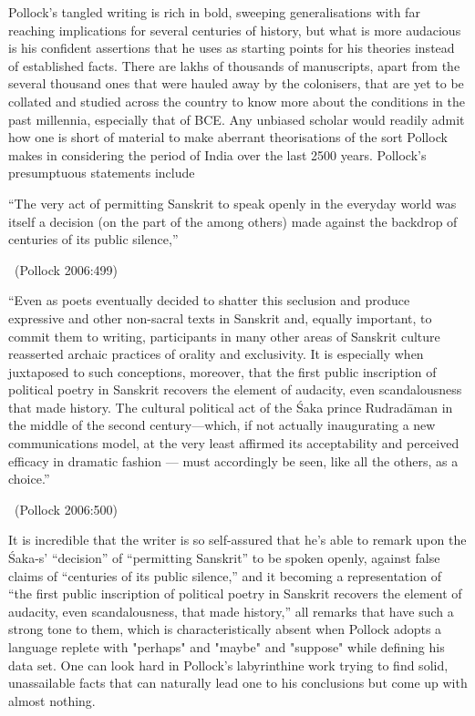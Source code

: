 Pollock’s tangled writing is rich in bold, sweeping generalisations with far reaching implications for several centuries of history, but what is more audacious is his confident assertions that he uses as starting points for his theories instead of established facts. There are lakhs of thousands of manuscripts, apart from the several thousand ones that were hauled away by the colonisers, that are yet to be collated and studied across the country to know more about the conditions in the past millennia, especially that of BCE. Any unbiased scholar would readily admit how one is short of material to make aberrant theorisations of the sort Pollock makes in considering the period of India over the last 2500 years. Pollock’s presumptuous statements include

\begin{myquote}
“The very act of permitting Sanskrit to speak openly in the everyday world was itself a decision (on the part of the among others) made against the backdrop of centuries of its public silence,” 

~\hfill (Pollock 2006:499)
\end{myquote}

\begin{myquote}
“Even as poets eventually decided to shatter this seclusion and produce expressive and other non-sacral texts in Sanskrit and, equally important, to commit them to writing, participants in many other areas of Sanskrit culture reasserted archaic practices of orality and exclusivity. It is especially when juxtaposed to such conceptions, moreover, that the first public inscription of political poetry in Sanskrit recovers the element of audacity, even scandalousness that made history. The cultural political act of the Śaka prince Rudradāman in the middle of the second century—which, if not actually inaugurating a new communications model, at the very least affirmed its acceptability and perceived efficacy in dramatic fashion — must accordingly be seen, like all the others, as a choice.” 

~\hfill (Pollock 2006:500)
\end{myquote}

It is incredible that the writer is so self-assured that he’s able to remark upon the Śaka-s' “decision” of “permitting Sanskrit” to be spoken openly, against false claims of “centuries of its public silence,” and it becoming a representation of “the first public inscription of political poetry in Sanskrit recovers the element of audacity, even scandalousness, that made history,” all remarks that have such a strong tone to them, which is characteristically absent when Pollock adopts a language replete with "perhaps" and "maybe" and "suppose" while defining his data set. One can look hard in Pollock’s labyrinthine work trying to find solid, unassailable facts that can naturally lead one to his conclusions but come up with almost nothing.

